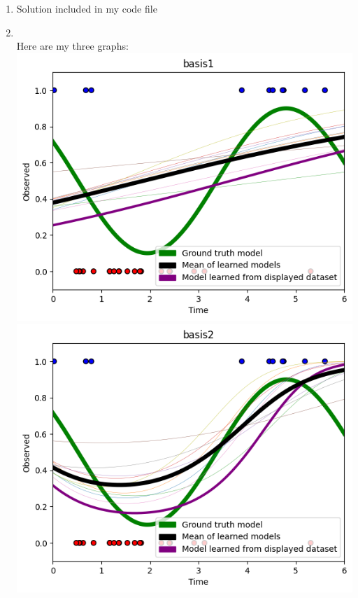 \documentclass[submit]{harvardml}
\begin{document}
 \begin{enumerate}
     \item Solution included in my code file \\
     \item\\
     Here are my three graphs:\\
     \includegraphics[scale=0.4]{hw2/images/q1_basis1.png}
     \includegraphics[scale=0.4]{hw2/images/q1_basis2.png}\\
     \begin{center}

\end{center}
\end{enumerate}
\end{document}
